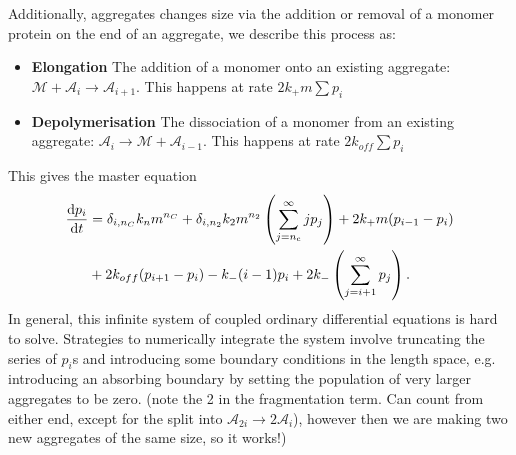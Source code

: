 \noindent Additionally, aggregates changes size via the addition or removal of a monomer protein on the end of an aggregate, we describe this process as:
\begin{itemize}
    \item \textbf{Elongation} The addition of a monomer onto an existing aggregate: $\mathcal{M} + \mathcal{A}_{i} \rightarrow \mathcal{A}_{i+1}$. This happens at rate $2 k_+ m \sum p_i$
    \item \textbf{Depolymerisation} The dissociation of a monomer from an existing aggregate: $\mathcal{A}_{i} \rightarrow \mathcal{M} + \mathcal{A}_{i-1}$. This happens at rate $2 k_{off} \sum p_i$
\end{itemize}

This gives the master equation
\begin{equation}
\begin{split}
    \frac{\text{d}p_i}{\text{d}t} &= \delta_{i, n_C}k_n m^{n_C} + \delta_{i, n_2} k_2 m^{n_2} \left(\sum_{j=n_{\mathrm{c}}}^{\infty} j p_j\right) + 2k_+ m (p_{i-1}-p_i) \\
    & + 2k_{off} (p_{i+1}-p_i) - k_{-}(i-1)p_i + 2k_{-}\left(\sum_{j=i+1}^{\infty}p_j\right).
    \end{split}
    \label{eq:pi_evolution}
\end{equation}
In general, this infinite system of coupled ordinary differential equations is hard to solve. Strategies to numerically integrate the system involve truncating the series of $p_i$s and introducing some boundary conditions in the length space, e.g. introducing an absorbing boundary by setting the population of very larger aggregates to be zero.
(note the 2 in the fragmentation term. Can count from either end, except for the split into $\mathcal{A}_{2i}\rightarrow2\mathcal{A}_i$), however then we are making two new aggregates of the same size, so it works!)

